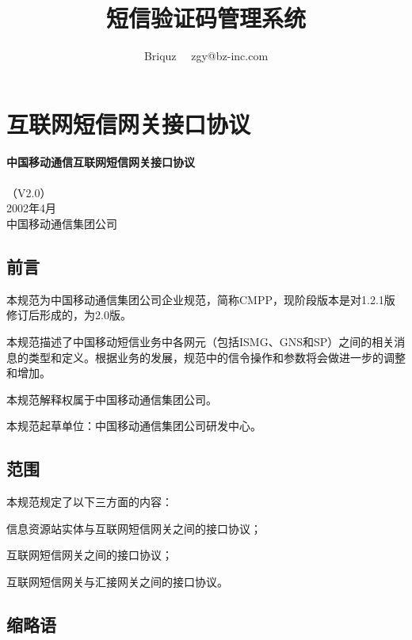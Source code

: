 \documentclass[11pt]{book} %
\title{短信验证码管理系统}
\author{Briquz ~~zgy@bz-inc.com}
\begin{document}
\maketitle
\tableofcontents
\listoffigures
\listoftables
\printindex




\part{互联网短信网关接口协议}

\begin{center}
\textbf{\huge 中国移动通信互联网短信网关接口协议}\\ \bigskip \bigskip {} \\ {\large（V2.0）} \bigskip \\ \bigskip 2002年4月\\ \vfill 中国移动通信集团公司
\end{center}

\chapter{前言}

本规范为中国移动通信集团公司企业规范，简称CMPP，现阶段版本是对1.2.1版修订后形成的，为2.0版。

本规范描述了中国移动短信业务中各网元（包括ISMG、GNS和SP）之间的相关消息的类型和定义。根据业务的发展，规范中的信令操作和参数将会做进一步的调整和增加。

本规范解释权属于中国移动通信集团公司。

本规范起草单位：中国移动通信集团公司研发中心。


\chapter{范围}

本规范规定了以下三方面的内容：

\begin{compactenum}
\item 信息资源站实体与互联网短信网关之间的接口协议；
\item 互联网短信网关之间的接口协议；
\item 互联网短信网关与汇接网关之间的接口协议。
\end{compactenum}


\chapter{缩略语}
\end{document}
